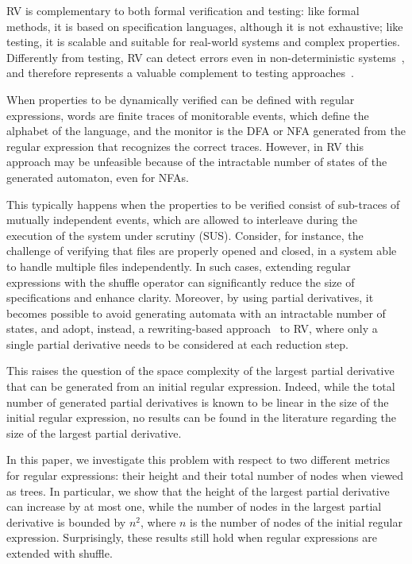 RV is complementary to both formal verification and testing: like formal methods, it is based on specification languages, although it is not exhaustive; like testing, it is scalable and suitable for real-world systems and complex properties. Differently from testing, RV can detect errors even in non-deterministic systems~\cite{HavelundRosu2004,SharmaEtAl2009,TowardsIoT17,SchiavioEtAl19}, and therefore represents a valuable complement to testing approaches~\cite{BesnardEtAl23}.

When properties to be dynamically verified can be defined with regular expressions, words are finite traces of monitorable events, which define the alphabet of the language, and the monitor is the DFA or NFA generated from the regular expression that recognizes the correct traces. However, in RV this approach may be unfeasible because of the intractable number of states of the generated automaton, even for NFAs.

This typically happens when the properties to be verified consist of sub-traces of mutually independent events, which are allowed to interleave during the execution of the system under scrutiny (SUS). Consider, for instance, the challenge of verifying that files are properly opened and closed, in a system able to handle multiple files independently. In such cases, extending regular expressions with the shuffle operator \cite{RML2021}
can significantly reduce the size of specifications and enhance clarity.
Moreover, by using partial derivatives, it becomes possible to avoid generating automata with an intractable number of states, and adopt, instead, a rewriting-based approach~\cite{RosuEtAl2005,RML2021}  to RV, where only a single partial derivative needs to be considered at each reduction step.

This raises the question of the space complexity of the largest partial derivative that can be generated from an initial regular expression. Indeed, while the total number of generated partial derivatives is known to be linear in the size of the initial regular expression, no results can be found in the literature regarding the size of the largest partial derivative.

In this paper, we investigate this problem with respect to two different metrics for regular expressions: their height and their total number of nodes when viewed as trees. In particular, we show that the height of the largest partial derivative can increase by at most one, while the number of nodes in the largest partial derivative is bounded by $n^2$, where $n$ is the number of nodes of the initial regular expression. Surprisingly, these results still hold when regular expressions are extended with shuffle.

